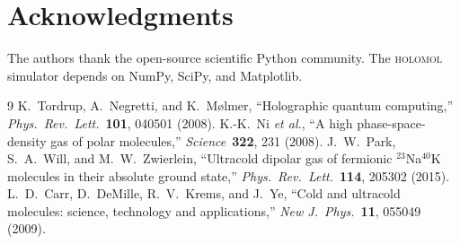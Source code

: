 \documentclass[11pt]{article}
\begin{document}
\section*{Acknowledgments}
The authors thank the open-source scientific Python community. The
\textsc{holomol} simulator depends on NumPy, SciPy, and Matplotlib.


\begin{thebibliography}{9}
 K.~Tordrup, A.~Negretti, and K.~M\o lmer,
  ``Holographic quantum computing,''
  \emph{Phys.\ Rev.\ Lett.}\ \textbf{101}, 040501 (2008).
 K.-K.~Ni \emph{et al.},
  ``A high phase-space-density gas of polar molecules,''
  \emph{Science}\ \textbf{322}, 231 (2008).
 J.~W.~Park, S.~A.~Will, and M.~W.~Zwierlein,
  ``Ultracold dipolar gas of fermionic $^{23}$Na$^{40}$K molecules in
  their absolute ground state,''
  \emph{Phys.\ Rev.\ Lett.}\ \textbf{114}, 205302 (2015).
 L.~D.~Carr, D.~DeMille, R.~V.~Krems, and J.~Ye,
  ``Cold and ultracold molecules: science, technology and
  applications,''
  \emph{New J.\ Phys.}\ \textbf{11}, 055049 (2009).
\end{thebibliography}
\end{document}
